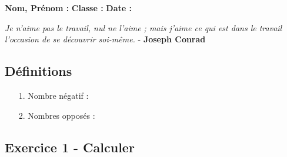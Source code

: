 



\textbf{Nom, Prénom :} \hspace{8cm} \textbf{Classe :} \hspace{3cm} \textbf{Date :}\\
\vspace{-0.8cm}
\begin{center}
  \textit{Je n'aime pas le travail, nul ne l'aime ; mais j'aime ce qui est dans le travail l'occasion de se découvrir soi-même.}  - \textbf{Joseph Conrad}
\end{center}
\vspace{-0.8cm}

\subsection*{Définitions}
  \begin{enumerate}
    \item[1.] Nombre négatif : \dotfill \\
    \Pointilles[1]
    \item[2.] Nombres opposés : \dotfill \\
    \Pointilles[1]
  \end{enumerate}

\subsection*{Exercice 1 - Calculer}

